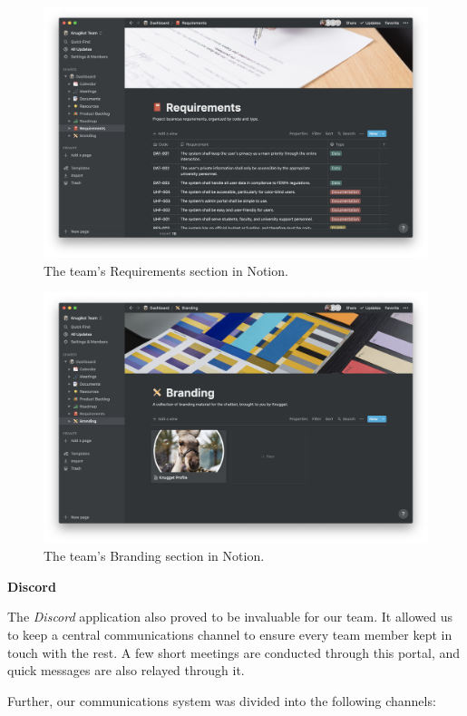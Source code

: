 \documentclass[titlepage, 12pt]{article}
\begin{document}
\begin{figure}[p]
    \centering\includegraphics[width=1\linewidth]{images/pm/requirements.png}
    \caption{The team's Requirements section in Notion.}
\end{figure}

\begin{figure}[h]
    \centering\includegraphics[width=1\linewidth]{images/pm/branding.png}
    \caption{The team's Branding section in Notion.}
\end{figure}


\textbf{Discord}

The \emph{Discord} application also proved to be invaluable for our team. It allowed us to keep a central communications channel to ensure every team member kept in touch with the rest. A few short meetings are conducted through this portal, and quick messages are also relayed through it.

Further, our communications system was divided into the following channels:
\end{document}
